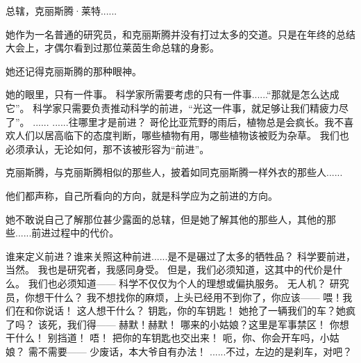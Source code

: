 \documentclass[openany]{book}
\begin{document}
\begin{dialogue}
     总辖，克丽斯腾·莱特......\par
    她作为一名普通的研究员，和克丽斯腾并没有打过太多的交道。只是在年终的总结大会上，才偶尔看到过那位莱茵生命总辖的身影。\par
    她还记得克丽斯腾的那种眼神。\par
    她的眼里，只有一件事。
     科学家所需要考虑的只有一件事......“那就是怎么达成它”。
     科学家只需要负责推动科学的前进，“光这一件事，就足够让我们精疲力尽了”。
     ......
     ......往哪里才是前进？
     哥伦比亚荒野的雨后，植物总是会疯长。我不喜欢人们以居高临下的态度判断，哪些植物有用，哪些植物该被贬为杂草。
     我们也必须承认，无论如何，那不该被形容为“前进”。\par
    克丽斯腾，与克丽斯腾相似的那些人，披着如同克丽斯腾一样外衣的那些人......\par
    他们都声称，自己所看向的方向，就是科学应为之前进的方向。\par
    她不敢说自己了解那位甚少露面的总辖，但是她了解其他的那些人，其他的那些......前进过程中的代价。\par
    谁来定义前进？谁来关照这种前进......是不是碾过了太多的牺牲品？
     科学要前进，当然。
     我也是研究者，我感同身受。
     但是，我们必须知道，这其中的代价是什么。
     我们也必须知道——
     科学不仅仅为个人的理想或偏执服务。
     无人机？
     研究员，你想干什么？
     我不想找你的麻烦，上头已经用不到你了，你应该——
     喂！我们在和你说话！
     这人想干什么？
     钥匙，你的车钥匙！
     她抢了一辆我们的车？她疯了吗？
     该死，我们得——
     赫默！赫默！
     哪来的小姑娘？这里是军事禁区！
     你想干什么！
     别挡道！
     唔！
     把你的车钥匙也交出来！
     呃，你、你会开车吗，小姑娘？
     需不需要——
     少废话，本大爷自有办法！
     ......不过，左边的是刹车，对吧？
\end{dialogue}
\end{document}
